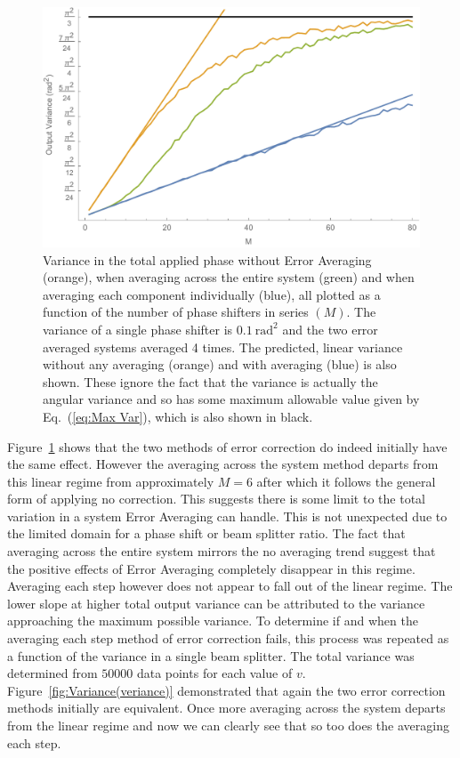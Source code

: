 \documentclass[aps,pra,twocolumn,superscriptaddress,numerical,floatfix]{revtex4-1}
\begin{document}
\begin{figure}
\centerline{\includegraphics[width=\columnwidth]{phase_all.pdf}}
\caption{Variance in the total applied phase without Error Averaging (orange), when averaging across the entire system (green) and when averaging each component individually (blue), all plotted as a function of the number of phase shifters in series $(M)$. The variance of a single phase shifter is $0.1\ \textrm{rad}^{2}$ and the two error averaged systems averaged 4 times. The predicted, linear variance without any averaging (orange) and with averaging (blue) is also shown. These ignore the fact that the variance is actually the angular variance and so has some maximum allowable value given by Eq.~(\ref{eq:Max Var}), which is also shown in black. \label{fig:Variance-in-phase all}}
\end{figure}
%
Figure~\ref{fig:Variance-in-phase all} shows that the two methods of error correction do indeed initially have the same effect. However the averaging across the system method departs from this linear regime from approximately $M=6$ after which it follows the general form of applying no correction. This suggests there is some limit to the total variation in a system Error Averaging can handle. This is not unexpected due to the limited domain for a phase shift or beam splitter ratio. The fact that averaging across the entire system mirrors the no averaging trend suggest that the positive effects of Error Averaging completely disappear in this regime. Averaging each step however does not appear to fall out of the linear regime. The lower slope at higher total output variance can be attributed to the variance approaching the maximum possible variance.  To determine if and when the averaging each step method of error correction fails, this process was repeated as a function of the variance in a single beam splitter. The total variance was determined from $50000$ data points for each value of $v$. Figure~\ref{fig:Variance(veriance)} demonstrated that again the two error correction methods initially are equivalent. Once more averaging across the system departs from the linear regime and now we can clearly see that so too does the averaging each step.
\end{document}
